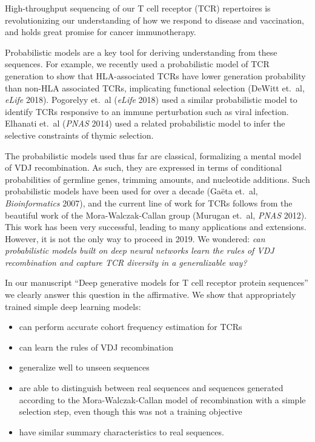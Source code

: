\documentclass[letterpaper,10pt]{article}
\begin{document}
High-throughput sequencing of our T cell receptor (TCR) repertoires is revolutionizing our understanding of how we respond to disease and vaccination, and holds great promise for cancer immunotherapy.

Probabilistic models are a key tool for deriving understanding from these sequences.
For example, we recently used a probabilistic model of TCR generation to show that HLA-associated TCRs have lower generation probability than non-HLA associated TCRs, implicating functional selection (DeWitt et.\ al, \emph{eLife} 2018).
Pogorelyy et.\ al (\emph{eLife} 2018) used a similar probabilistic model to identify TCRs responsive to an immune perturbation such as viral infection.
Elhanati et.\ al (\emph{PNAS} 2014) used a related probabilistic model to infer the selective constraints of thymic selection.

The probabilistic models used thus far are classical, formalizing a mental model of VDJ recombination.
As such, they are expressed in terms of conditional probabilities of germline genes, trimming amounts, and nucleotide additions.
Such probabilistic models have been used for over a decade (Ga\"eta et.\ al, \emph{Bioinformatics} 2007), and the current line of work for TCRs follows from the beautiful work of the Mora-Walczak-Callan group (Murugan et.\ al, \emph{PNAS} 2012).
This work has been very successful, leading to many applications and extensions.
However, it is not the only way to proceed in 2019.
We wondered: \emph{can probabilistic models built on deep neural networks learn the rules of VDJ recombination and capture TCR diversity in a generalizable way?}

In our manuscript ``Deep generative models for T cell receptor protein sequences'' we clearly answer this question in the affirmative.
We show that appropriately trained simple deep learning models:
\vspace{-4pt}
\begin{itemize}
  \item can perform accurate cohort frequency estimation for TCRs
  \item can learn the rules of VDJ recombination
  \item generalize well to unseen sequences
  \item are able to distinguish between real sequences and sequences generated according to the Mora-Walczak-Callan model of recombination with a simple selection step, even though this was not a training objective
  \item have similar summary characteristics to real sequences.
\end{itemize}
\end{document}
